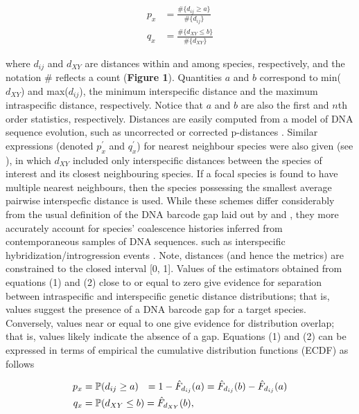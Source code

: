 \documentclass[12pt]{article}
\begin{document}
\begin{align}
p_x &= \frac{\#\{d_{ij} \geq a\}}{\#\{d_{ij}\}} \\[1mm]
q_x &= \frac{\#\{d_{XY} \leq b\}}{\#\{d_{XY}\}}
\end{align}

\noindent where $d_{ij}$ and $d_{XY}$ are distances within and among species, respectively, and the notation \# reflects a count (\textbf{Figure 1}). Quantities $a$ and $b$ correspond to min($d_{XY}$) and max($d_{ij}$), the minimum interspecific distance and the maximum intraspecific distance, respectively. Notice that $a$ and $b$ are also the first and $n$th order statistics, respectively. Distances are easily computed from a model of DNA sequence evolution, such as uncorrected or corrected p-distances \citep{jukes1969evolution, kimura1980simple}. Similar expressions (denoted $p^{'}_x$ and $q^{'}_x$) for nearest neighbour species were also given (see \cite{phillips2024measure}), in which $d_{XY}$ included only interspecific distances between the species of interest and its closest neighbouring species. If a focal species is found to have multiple nearest neighbours, then the species possessing the smallest average pairwise interspecfic distance is used. While these schemes differ considerably from the usual definition of the DNA barcode gap laid out by \citet{meyer2005dna} and \citet{meier2008use}, they more accurately account for species' coalescence histories inferred from contemporaneous samples of DNA sequences. such as interspecific hybridization/introgression events \citep{phillips2024measure}. Note, distances (and hence the metrics) are constrained to the closed interval [0, 1]. Values of the estimators obtained from equations (1) and (2) close to or equal to zero give evidence for separation between intraspecific and interspecific genetic distance distributions; that is, values suggest the presence of a DNA barcode gap for a target species. Conversely, values near or equal to one give evidence for distribution overlap; that is, values likely indicate the absence of a gap. Equations (1) and (2) can be expressed in terms of empirical the cumulative distribution functions (ECDF) as follows

\begin{align}
p_x &= \mathbb{P}(d_{ij} \geq a) \hspace{2.5mm} = 1 - \hat{F}_{d_{ij}}(a) = \hat{F}_{d_{ij}}(b) - \hat{F}_{d_{ij}}(a)  \\
q_x &= \mathbb{P}(d_{XY} \leq b) = \hat{F}_{d_{XY}}(b),
\end{align}
\end{document}
